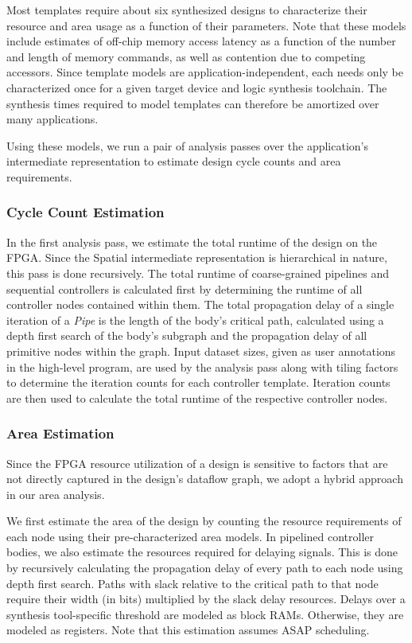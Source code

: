Most templates require about six synthesized designs to characterize their resource and area usage as a function of their parameters. Note that these models include estimates of off-chip memory access latency as a function of the
number and length of memory commands, as well as contention due to competing accessors. Since template models are application-independent, each needs only be characterized once for a given target device and logic synthesis toolchain. The synthesis times required to model templates can therefore be amortized over many applications.

Using these models, we run a pair of analysis passes over the application's intermediate representation to estimate design cycle counts and area requirements.

\subsubsection{Cycle Count Estimation}
In the first analysis pass, we estimate the total runtime of the design on the FPGA.
Since the Spatial intermediate representation is hierarchical in nature, this pass is done recursively.
The total runtime of coarse-grained pipelines and sequential controllers is calculated first by determining
the runtime of all controller nodes contained within them. The total propagation delay of a single
iteration of a \emph{Pipe} is the length of the body's critical path, calculated using a depth first
search of the body's subgraph and the propagation delay of all primitive nodes within the graph.
Input dataset sizes, given as user annotations in the high-level program, are used by the analysis pass
along with tiling factors to determine the iteration counts for each controller template.
Iteration counts are then used to calculate the total runtime of the respective controller nodes.


\subsubsection{Area Estimation}
Since the FPGA resource utilization of a design is sensitive to factors that are not directly captured
in the design's dataflow graph, we adopt a hybrid approach in our area analysis.

We first estimate the area of the design by counting the resource
requirements of each node using their pre-characterized area models. In pipelined controller bodies, we also
estimate the resources required for delaying signals. This is done by recursively calculating the
propagation delay of every path to each node using depth first search. Paths with slack relative to
the critical path to that node require their width (in bits) multiplied by the slack delay resources.
Delays over a synthesis tool-specific threshold are modeled as block RAMs.
Otherwise, they are modeled as registers. Note that this estimation assumes ASAP scheduling.

